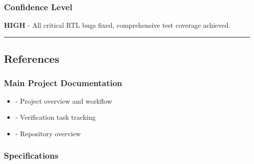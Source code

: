 \subsubsection{Confidence Level}\label{cr:fix:fixes-index:confidence-level}

\begin{record}

\textbf{HIGH} - All critical RTL bugs fixed, comprehensive test coverage
achieved.

\begin{center}\rule{0.5\linewidth}{0.5pt}\end{center}

\end{record}

\subsection{References}\label{cr:fix:fixes-index:references}

\subsubsection{Main Project Documentation}\label{cr:fix:fixes-index:main-project-documentation}

\begin{record}

\begin{itemize}
\tightlist
\item
   - Project overview and workflow
\item
   - Verification task tracking
\item
   - Repository overview
\end{itemize}

\end{record}

\subsubsection{Specifications}\label{cr:fix:fixes-index:specifications}

